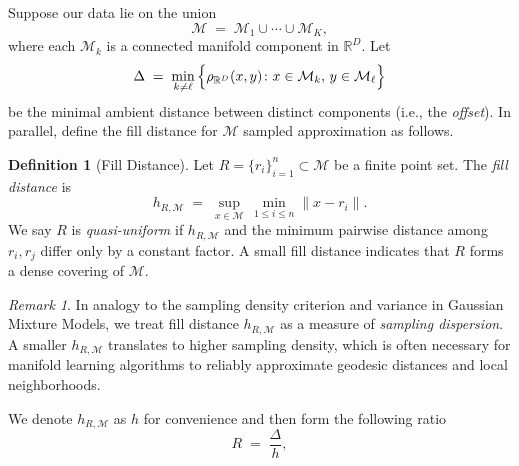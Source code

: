 \documentclass{article}
\theoremstyle{plain}
\theoremstyle{definition}
\newtheorem{definition}[theorem]{Definition}
\theoremstyle{remark}
\newtheorem{remark}[theorem]{Remark}
\begin{document}
Suppose our data lie on the union
$$
\mathcal{M} \;=\; \mathcal{M}_1 \cup \cdots \cup \mathcal{M}_K,
$$
where each $\mathcal{M}_k$ is a connected manifold component in $\mathbb{R}^D$. Let
$$
\Delta \;=\; 
\min_{k\neq \ell}\,\Bigl\{\rho_{\mathbb{R}^D}(x,y)\colon x\in\mathcal{M}_k,\,y\in\mathcal{M}_\ell\Bigr\}
$$
be the minimal ambient distance between distinct components (i.e., the \emph{offset}). In parallel, define the fill distance for $\mathcal{M}$ sampled approximation as follows.

\begin{definition}[Fill Distance] \label{sec:prelim-filldist}
Let $R = \{r_i\}_{i=1}^n \subset \mathcal{M}$ be a finite point set. The \emph{fill distance} is
$$
h_{R,\mathcal{M}} \;=\; \sup_{x \in \mathcal{M}}\, \min_{1 \leq i \leq n} \|x - r_i\|.
$$
We say $R$ is \emph{quasi-uniform} if $h_{R,\mathcal{M}}$ and the minimum pairwise distance among $r_i,r_j$ differ only by a constant factor. A small fill distance indicates that $R$ forms a dense covering of $\mathcal{M}$.
\end{definition}

\begin{remark}
    In analogy to the sampling density criterion and variance in Gaussian Mixture Models, we treat fill distance $h_{R,\mathcal{M}}$ as a measure of \emph{sampling dispersion}. A smaller $h_{R,\mathcal{M}}$ translates to higher sampling density, which is often necessary for manifold learning algorithms to reliably approximate geodesic distances and local neighborhoods.
\end{remark}

We denote $h_{R,\mathcal{M}}$ as $h$ for convenience and then form the following ratio
$$
R \;=\; \frac{\Delta}{h},
$$
\end{document}
